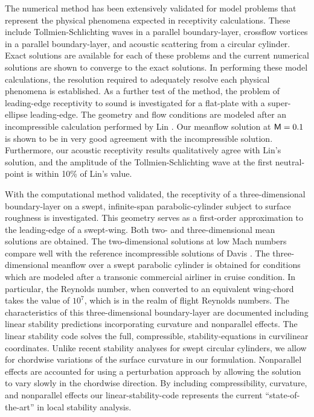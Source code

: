 The numerical method has been extensively validated for model problems that
represent the physical phenomena expected in receptivity calculations.  These
include Tollmien-Schlichting waves in a parallel boundary-layer, crossflow
vortices in a parallel boundary-layer, and acoustic scattering from a circular
cylinder.  Exact solutions are available for each of these problems and the
current numerical solutions are shown to converge to the exact solutions.  In
performing these model calculations, the resolution required to adequately
resolve each physical phenomena is established.  As a further test of the
method, the problem of leading-edge receptivity to sound is investigated for a
flat-plate with a super-ellipse leading-edge.  The geometry and flow
conditions are modeled after an incompressible calculation performed by Lin
\cite{Lin:92}.  Our meanflow solution at ${\sf M}=0.1$ is shown to be in very good
agreement with the incompressible solution.  Furthermore, our acoustic
receptivity results qualitatively agree with Lin's solution, and the amplitude
of the Tollmien-Schlichting wave at the first neutral-point is within 10\% of
Lin's value.

With the computational method validated, the receptivity of a
three-dimensional boundary-layer on a swept, infinite-span parabolic-cylinder
subject to surface roughness is investigated.  This geometry serves as a
first-order approximation to the leading-edge of a swept-wing.  Both two- and
three-dimensional mean solutions are obtained.  The two-dimensional solutions
at low Mach numbers compare well with the reference incompressible solutions
of Davis \cite{Davis:72}.  The three-dimensional meanflow over a swept
parabolic cylinder is obtained for conditions which are modeled after a
transonic commercial airliner in cruise condition.  In particular, the
Reynolds number, when converted to an equivalent wing-chord takes the value of
$10^7$, which is in the realm of flight Reynolds numbers.  The characteristics
of this three-dimensional boundary-layer are documented including linear
stability predictions incorporating curvature and nonparallel effects.  The
linear stability code solves the full, compressible, stability-equations in
curvilinear coordinates.  Unlike recent stability analyses for swept circular
cylinders, we allow for chordwise variations of the surface curvature in our
formulation.  Nonparallel effects are accounted for using a perturbation
approach by allowing the solution to vary slowly in the chordwise direction.
By including compressibility, curvature, and nonparallel effects our
linear-stability-code represents the current ``state-of-the-art'' in local
stability analysis.


